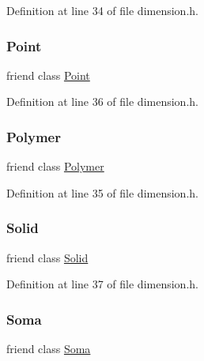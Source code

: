 Definition at line 34 of file dimension.\+h.

\mbox{\label{class_dimension_aa238d52f825b8ea8da6a5c4ae1b8d482}} 
\subsubsection{\texorpdfstring{Point}{Point}}
{\footnotesize\ttfamily friend class \mbox{\hyperlink{class_point}{Point}}\hspace{0.3cm}{\ttfamily [friend]}}



Definition at line 36 of file dimension.\+h.

\mbox{\label{class_dimension_ae64ddc1700c5abc4106cbcc5843a4a42}} 
\subsubsection{\texorpdfstring{Polymer}{Polymer}}
{\footnotesize\ttfamily friend class \mbox{\hyperlink{class_polymer}{Polymer}}\hspace{0.3cm}{\ttfamily [friend]}}



Definition at line 35 of file dimension.\+h.

\mbox{\label{class_dimension_a5636b9113fd1246b3392dd52b3138229}} 
\subsubsection{\texorpdfstring{Solid}{Solid}}
{\footnotesize\ttfamily friend class \mbox{\hyperlink{class_solid}{Solid}}\hspace{0.3cm}{\ttfamily [friend]}}



Definition at line 37 of file dimension.\+h.

\mbox{\label{class_dimension_aaa07b7b364b620b9a781f30a5cd9f5ea}} 
\subsubsection{\texorpdfstring{Soma}{Soma}}
{\footnotesize\ttfamily friend class \mbox{\hyperlink{class_soma}{Soma}}\hspace{0.3cm}{\ttfamily [friend]}}



